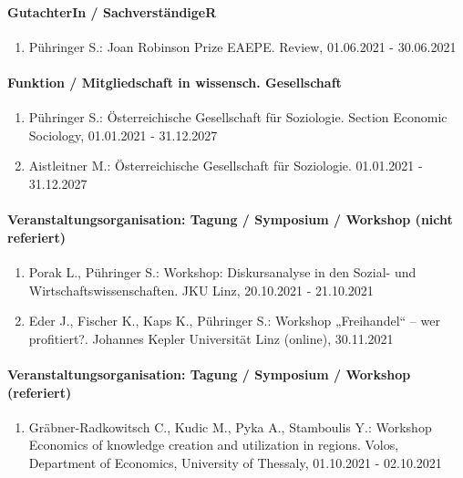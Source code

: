 \paragraph{GutachterIn / SachverständigeR}
\begin{enumerate}[leftmargin=*, labelsep=0.5cm]
\item Pühringer S.: Joan Robinson Prize EAEPE. Review, 01.06.2021 - 30.06.2021
\end{enumerate}
\paragraph{Funktion / Mitgliedschaft in wissensch. Gesellschaft}
\begin{enumerate}[leftmargin=*, labelsep=0.5cm]
\item Pühringer S.: Österreichische Gesellschaft für Soziologie. Section Economic Sociology, 01.01.2021 - 31.12.2027
\item Aistleitner M.: Österreichische Gesellschaft für Soziologie. 01.01.2021 - 31.12.2027
\end{enumerate}
\paragraph{Veranstaltungsorganisation: Tagung / Symposium / Workshop (nicht referiert)}
\begin{enumerate}[leftmargin=*, labelsep=0.5cm]
\item Porak L., Pühringer S.: Workshop: Diskursanalyse in den Sozial- und Wirtschaftswissenschaften. JKU Linz, 20.10.2021 - 21.10.2021
\item Eder J., Fischer K., Kaps K., Pühringer S.: Workshop „Freihandel“ – wer profitiert?. Johannes Kepler Universität Linz (online), 30.11.2021
\end{enumerate}
\paragraph{Veranstaltungsorganisation: Tagung / Symposium / Workshop (referiert)}
\begin{enumerate}[leftmargin=*, labelsep=0.5cm]
\item Gräbner-Radkowitsch C., Kudic M., Pyka A., Stamboulis Y.: Workshop Economics of knowledge creation and utilization in regions. Volos, Department of Economics, University of Thessaly, 01.10.2021 - 02.10.2021
\end{enumerate}
